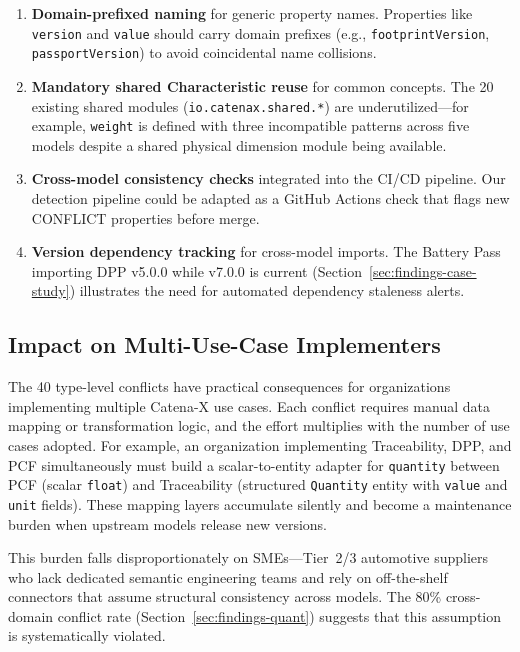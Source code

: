 \documentclass[]{ceurart}
\begin{document}
\begin{enumerate}
  \item \textbf{Domain-prefixed naming} for generic property names.
    Properties like \texttt{version} and \texttt{value} should carry
    domain prefixes (e.g., \texttt{footprintVersion},
    \texttt{passportVersion}) to avoid coincidental name collisions.
  \item \textbf{Mandatory shared Characteristic reuse} for common
    concepts. The 20 existing shared modules
    (\texttt{io.catenax.shared.*}) are underutilized---for example,
    \texttt{weight} is defined with three incompatible patterns across
    five models despite a shared physical dimension module being
    available.
  \item \textbf{Cross-model consistency checks} integrated into the
    CI/CD pipeline. Our detection pipeline could be adapted as a GitHub
    Actions check that flags new CONFLICT properties before merge.
  \item \textbf{Version dependency tracking} for cross-model imports.
    The Battery Pass importing DPP v5.0.0 while v7.0.0 is current
    (Section~\ref{sec:findings-case-study}) illustrates the need for
    automated dependency staleness alerts.
\end{enumerate}

\subsection{Impact on Multi-Use-Case Implementers}

The 40 type-level conflicts have practical consequences for organizations
implementing multiple Catena-X use cases. Each conflict requires manual
data mapping or transformation logic, and the effort multiplies with the
number of use cases adopted. For example, an organization implementing
Traceability, DPP, and PCF simultaneously must build a scalar-to-entity
adapter for \texttt{quantity} between PCF (scalar \texttt{float}) and
Traceability (structured \texttt{Quantity} entity with \texttt{value}
and \texttt{unit} fields). These mapping layers accumulate silently and
become a maintenance burden when upstream models release new versions.

This burden falls disproportionately on SMEs---Tier~2/3 automotive
suppliers who lack dedicated semantic engineering teams and rely on
off-the-shelf connectors that assume structural consistency across
models. The 80\% cross-domain conflict rate
(Section~\ref{sec:findings-quant}) suggests that this assumption is
systematically violated.
\end{document}
